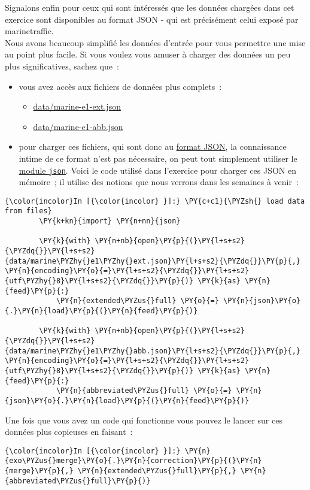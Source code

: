     Signalons enfin pour ceux qui sont intéressés que les données chargées
dans cet exercice sont disponibles au format JSON - qui est précisément
celui exposé par marinetraffic.\\

Nous avons beaucoup simplifié les données d'entrée pour vous permettre
une mise au point plus facile. Si vous voulez vous amuser à charger des
données un peu plus significatives, sachez que~:

\begin{itemize}
\tightlist
\item
  vous avez accès aux fichiers de données plus complets~:

  \begin{itemize}
  \tightlist
  \item
    \url{data/marine-e1-ext.json}
  \item
    \url{data/marine-e1-abb.json}
  \end{itemize}
\item
  pour charger ces fichiers, qui sont donc au
  \href{http://en.wikipedia.org/wiki/JSON}{format JSON}, la connaissance
  intime de ce format n'est pas nécessaire, on peut tout simplement
  utiliser le \href{https://docs.python.org/3/library/json.html}{module
  \texttt{json}}. Voici le code utilisé dans l'exercice pour charger ces
  JSON en mémoire~; il utilise des notions que nous verrons dans les
  semaines à venir~:
\end{itemize}

    \begin{Verbatim}[commandchars=\\\{\}]
{\color{incolor}In [{\color{incolor} }]:} \PY{c+c1}{\PYZsh{} load data from files}
        \PY{k+kn}{import} \PY{n+nn}{json}
        
        \PY{k}{with} \PY{n+nb}{open}\PY{p}{(}\PY{l+s+s2}{\PYZdq{}}\PY{l+s+s2}{data/marine\PYZhy{}e1\PYZhy{}ext.json}\PY{l+s+s2}{\PYZdq{}}\PY{p}{,} \PY{n}{encoding}\PY{o}{=}\PY{l+s+s2}{\PYZdq{}}\PY{l+s+s2}{utf\PYZhy{}8}\PY{l+s+s2}{\PYZdq{}}\PY{p}{)} \PY{k}{as} \PY{n}{feed}\PY{p}{:}
            \PY{n}{extended\PYZus{}full} \PY{o}{=} \PY{n}{json}\PY{o}{.}\PY{n}{load}\PY{p}{(}\PY{n}{feed}\PY{p}{)}
        
        \PY{k}{with} \PY{n+nb}{open}\PY{p}{(}\PY{l+s+s2}{\PYZdq{}}\PY{l+s+s2}{data/marine\PYZhy{}e1\PYZhy{}abb.json}\PY{l+s+s2}{\PYZdq{}}\PY{p}{,} \PY{n}{encoding}\PY{o}{=}\PY{l+s+s2}{\PYZdq{}}\PY{l+s+s2}{utf\PYZhy{}8}\PY{l+s+s2}{\PYZdq{}}\PY{p}{)} \PY{k}{as} \PY{n}{feed}\PY{p}{:}
            \PY{n}{abbreviated\PYZus{}full} \PY{o}{=} \PY{n}{json}\PY{o}{.}\PY{n}{load}\PY{p}{(}\PY{n}{feed}\PY{p}{)}
\end{Verbatim}


    Une fois que vous avez un code qui fonctionne vous pouvez le lancer sur
ces données plus copieuses en faisant~:

    \begin{Verbatim}[commandchars=\\\{\}]
{\color{incolor}In [{\color{incolor} }]:} \PY{n}{exo\PYZus{}merge}\PY{o}{.}\PY{n}{correction}\PY{p}{(}\PY{n}{merge}\PY{p}{,} \PY{n}{extended\PYZus{}full}\PY{p}{,} \PY{n}{abbreviated\PYZus{}full}\PY{p}{)}
\end{Verbatim}